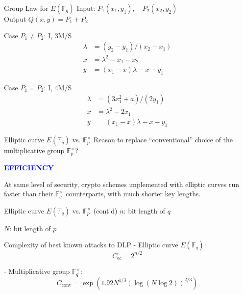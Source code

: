 \documentclass{beamer}
\begin{document}
\begin{frame}{Group Law for $E(\mathbb{F}_q)$}
Input: $P_1(x_1, y_1), \quad P_2(x_2, y_2)$\\
Output $Q(x, y) = P_1 + P_2$

\begin{block}{Case $P_1 \ne P_2$: I, 3M/S}
\begin{align*}
\lambda & = (y_2 - y_1)/(x_2 - x_1) \\
x & = \lambda^2 - x_1 - x_2 \\
y & = (x_1 - x)\lambda - x - y_1
\end{align*}
\end{block}

\begin{block}{Case $P_1 = P_2$: I, 4M/S}
\begin{align*}
\lambda & = (3x_1^2 + a)/(2y_1) \\
x & = \lambda^2 - 2 x_1 \\
y & = (x_1 - x)\lambda - x - y_1
\end{align*}
\end{block}
\end{frame}

\begin{frame}{Elliptic curve $E(\mathbb{F}_q)$ vs. $\mathbb{F}_p^{\times}$}
\large Reason to replace ``conventional'' choice of the multiplicative group 
$\mathbb{F}_p^{\times}$?
~\\[.5in]
\pause
\begin{center}
\textcolor{blue}{\bf\Huge EFFICIENCY}
\end{center}

At same level of security, crypto schemes implemented with elliptic
curves run faster than their $\mathbb{F}_q^{\times}$ counterparts, with
much shorter key lengths.
\end{frame}

\begin{frame}{Elliptic curve $E(\mathbb{F}_q)$ vs. $\mathbb{F}_p^{\times}$ 
(cont'd)}
 $n$: bit length of $q$

 $N$: bit length of $p$

\begin{block}{Complexity of best known attacks to DLP}
- Elliptic curve $E(\mathbb{F}_q)$: 
$$C_{\mathrm{ec}} = 2^{n/2}$$

- Multiplicative group $\mathbb{F}_q^{\times}$: 
$$C_{\mathrm{conv}} = \exp(1.92 N^{1/3} (\log(N \log 2))^{2/3})$$

\end{block}
\end{frame}
\end{document}

